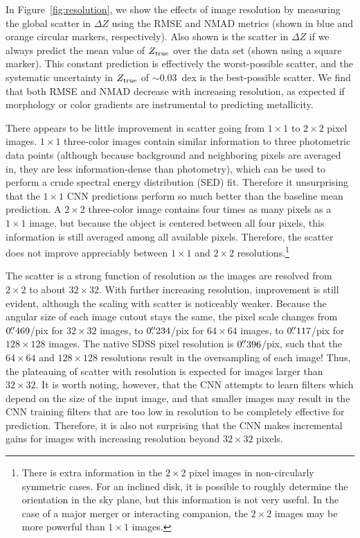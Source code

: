 \documentclass[fleqn,usenatbib]{mnras}
\begin{document}
In Figure~\ref{fig:resolution}, we show the effects of image resolution by measuring the global scatter in $\Delta Z$ using the RMSE and NMAD metrics (shown in blue and orange circular markers, respectively). Also shown is the scatter in $\Delta Z$ if we always predict the mean value of $Z_{\rm true}$ over the data set (shown using a square marker). This constant prediction is effectively the worst-possible scatter, and the \cite{Tremonti2004} systematic uncertainty in $Z_{\rm true}$ of $\sim 0.03$~dex is the best-possible scatter. We find that both RMSE and NMAD decrease with increasing resolution, as expected if morphology or color gradients are instrumental to predicting metallicity.

There appears to be little improvement in scatter going from $1 \times 1$ to $2\times 2$ pixel images. $1\times 1$ three-color images contain similar information to three photometric data points (although because background and neighboring pixels are averaged in, they are less information-dense than photometry), which can be used to perform a crude spectral energy distribution (SED) fit.
Therefore it unsurprising that the $1 \times 1$ CNN predictions perform so much better than the baseline mean prediction. A $2 \times 2$ three-color image contains four times as many pixels as a $1\times 1$ image, but because the object is centered between all four pixels, this information is still averaged among all available pixels. Therefore, the scatter does not improve appreciably between $1 \times 1$ and $2 \times 2$ resolutions.\footnote{There is extra information in the $2\times 2$ pixel images in non-circularly symmetric cases. For an inclined disk, it is possible to roughly determine the orientation in the sky plane, but this information is not very useful. In the case of a major merger or interacting companion, the $2\times 2$ images may be more powerful than $1 \times 1$ images.}

The scatter is a strong function of resolution as the images are resolved from $2 \times 2$ to about $32 \times 32$. With further increasing resolution, improvement is still evident, although the scaling with scatter is noticeably weaker. Because the angular size of each image cutout stays the same, the pixel scale changes from $0\hbox{$.\!\!^{\prime\prime}$}469$/pix for $32 \times 32$ images, to $0\hbox{$.\!\!^{\prime\prime}$}234$/pix for $64 \times 64$ images, to $0\hbox{$.\!\!^{\prime\prime}$}117$/pix for $128 \times 128$ images. The native SDSS pixel resolution is $0\hbox{$.\!\!^{\prime\prime}$}396$/pix, such that the $64 \times 64$ and $128 \times 128$ resolutions result in the oversampling of each image! Thus, the plateauing of scatter with resolution is expected for images larger than $32 \times 32$. It is worth noting, however, that the CNN attempts to learn filters which depend on the size of the input image, and that smaller images may result in the CNN training filters that are too low in resolution to be completely effective for prediction. Therefore, it is also not surprising that the CNN makes incremental gains for images with increasing resolution beyond $32 \times 32$ pixels.
\end{document}
